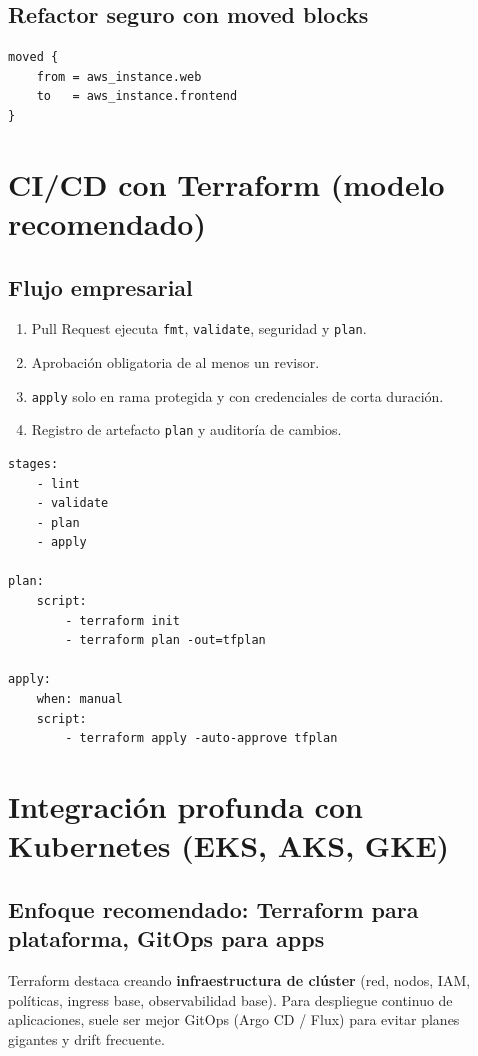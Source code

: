 \documentclass[12pt,a4paper]{article}
\begin{document}
\subsection{Refactor seguro con moved blocks}
\begin{lstlisting}[caption=Renombrado sin recrear recursos]
moved {
	from = aws_instance.web
	to   = aws_instance.frontend
}
\end{lstlisting}

\section{CI/CD con Terraform (modelo recomendado)}

\subsection{Flujo empresarial}
\begin{enumerate}
		\item Pull Request ejecuta \texttt{fmt}, \texttt{validate}, seguridad y \texttt{plan}.
		\item Aprobación obligatoria de al menos un revisor.
		\item \texttt{apply} solo en rama protegida y con credenciales de corta duración.
		\item Registro de artefacto \texttt{plan} y auditoría de cambios.
\end{enumerate}

\begin{lstlisting}[caption=Esqueleto CI (pseudo-pipeline)]
stages:
	- lint
	- validate
	- plan
	- apply

plan:
	script:
		- terraform init
		- terraform plan -out=tfplan

apply:
	when: manual
	script:
		- terraform apply -auto-approve tfplan
\end{lstlisting}

\section{Integración profunda con Kubernetes (EKS, AKS, GKE)}

\subsection{Enfoque recomendado: Terraform para plataforma, GitOps para apps}
Terraform destaca creando \textbf{infraestructura de clúster} (red, nodos, IAM, políticas, ingress base, observabilidad base).
Para despliegue continuo de aplicaciones, suele ser mejor GitOps (Argo CD / Flux) para evitar planes gigantes y drift frecuente.
\end{document}
